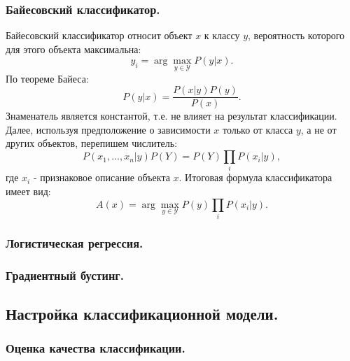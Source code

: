 \documentclass[12pt]{article}
\begin{document}
\subsubsection{Байесовский классификатор.}

\par
Байесовский классификатор относит объект $x$ к классу $y$, 
вероятность которого для этого объекта максимальна:
\[
    y_i = \arg \max_{y\in\mathcal{Y}} P(y|x).
\]
По теореме Байеса:
\[
    P(y|x)=\frac{P(x|y)P(y)}{P(x)}.
\]
Знаменатель является константой, т.е. не влияет на результат классификации.
Далее, используя предположение о зависимости $x$ только от класса $y$, а не
от других объектов, перепишем числитель:
\[
    P(x_1, ..., x_n|y)P(Y) = P(Y)\prod_i P(x_i|y),
\]
где $x_i$ - признаковое описание объекта $x$. Итоговая формула классификатора имеет вид:
\[
    A(x)=\arg\max_{y\in\mathcal{Y}} P(y)\prod_i P(x_i|y).
\]

\subsubsection{Логистическая регрессия.}


\subsubsection{Градиентный бустинг.}


\subsection{Настройка классификационной модели.}


\subsubsection{Оценка качества классификации.}
\end{document}
